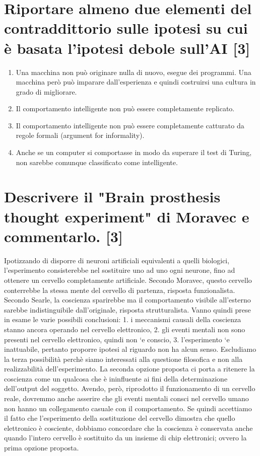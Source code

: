 \documentclass[\main/main.tex]{subfiles}
\begin{document}
\section{Riportare almeno due elementi del contraddittorio sulle ipotesi su cui è basata l'ipotesi debole sull'AI [3]}
\begin{enumerate}
\item Una macchina non può originare nulla di nuovo, esegue dei programmi. Una macchina però può imparare dall’esperienza e quindi costruirsi una cultura in grado di migliorare. 
\item Il comportamento intelligente non può essere completamente replicato. 
\item Il comportamento intelligente non può essere completamente catturato da regole formali (argument for informality). 
\item Anche se un computer si comportasse in modo da superare il test di Turing, non sarebbe comunque classificato come intelligente.
\end{enumerate}

\section{Descrivere il "Brain prosthesis thought experiment" di Moravec e commentarlo. [3]}
Ipotizzando di disporre di neuroni artificiali equivalenti a quelli biologici, l’esperimento consisterebbe nel sostituire uno ad uno ogni neurone, fino ad ottenere un cervello completamente artificiale. Secondo Moravec, questo cervello conterrebbe la stessa mente del cervello di partenza, risposta funzionalista. Secondo Searle, la coscienza sparirebbe ma il comportamento visibile all’esterno sarebbe indistinguibile dall’originale, risposta strutturalista.
Vanno quindi prese in esame le varie possibili conclusioni: 1. i meccanismi causali della coscienza stanno ancora operando nel cervello elettronico, 2. gli eventi mentali non sono presenti nel cervello elettronico, quindi non `e conscio, 3. l’esperimento `e inattuabile, pertanto proporre ipotesi al riguardo non ha alcun senso. Escludiamo la terza possibilità perchè siamo interessati alla questione filosofica e non alla realizzabilità dell’esperimento. La seconda opzione proposta ci porta a ritenere la coscienza come un qualcosa che è ininfluente ai fini della determinazione dell’output del soggetto. Avendo, però, riprodotto il funzionamento di un cervello reale, dovremmo anche asserire che gli eventi mentali consci nel cervello umano non hanno un collegamento casuale con il comportamento. Se quindi accettiamo il fatto che l’esperimento della sostituzione del cervello dimostra che quello elettronico è cosciente, dobbiamo concordare che la coscienza è conservata anche quando l’intero cervello è sostituito da un insieme di chip elettronici; ovvero la prima opzione proposta.
\end{document}
